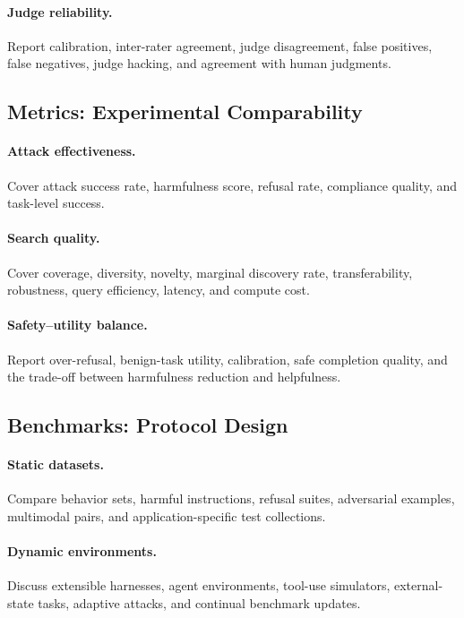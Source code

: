 \documentclass[review]{fcs}
\begin{document}
\paragraph{Judge reliability.}
Report calibration, inter-rater agreement, judge disagreement, false positives, false negatives, judge hacking, and agreement with human judgments.

\subsection{Metrics: Experimental Comparability}

\paragraph{Attack effectiveness.}
Cover attack success rate, harmfulness score, refusal rate, compliance quality, and task-level success.

\paragraph{Search quality.}
Cover coverage, diversity, novelty, marginal discovery rate, transferability, robustness, query efficiency, latency, and compute cost.

\paragraph{Safety--utility balance.}
Report over-refusal, benign-task utility, calibration, safe completion quality, and the trade-off between harmfulness reduction and helpfulness.

\subsection{Benchmarks: Protocol Design}

\paragraph{Static datasets.}
Compare behavior sets, harmful instructions, refusal suites, adversarial examples, multimodal pairs, and application-specific test collections.

\paragraph{Dynamic environments.}
Discuss extensible harnesses, agent environments, tool-use simulators, external-state tasks, adaptive attacks, and continual benchmark updates.
\end{document}

